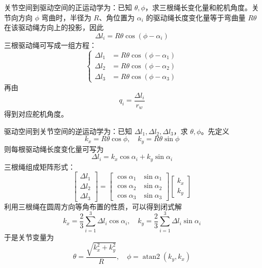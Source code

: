 \documentclass[UTF8,zihao=-4,oneside]{ctexrep}
\begin{document}
关节空间到驱动空间的正运动学为：已知 \(\theta,\phi\)，求三根绳长变化量和舵机角度。关节向方向 \(\phi\) 弯曲时，半径为 \(R\)、角位置为 \(\alpha_i\) 的驱动绳长度变化量等于弯曲量 \(R\theta\) 在该驱动绳方向上的投影，因此
\begin{equation}
  \Delta l_i = R\theta\cos(\phi-\alpha_i)
\end{equation}
三根驱动绳可写成一组方程：
\begin{equation}
  \left\{
  \begin{aligned}
    \Delta l_1 &= R\theta\cos(\phi-\alpha_1)\\
    \Delta l_2 &= R\theta\cos(\phi-\alpha_2)\\
    \Delta l_3 &= R\theta\cos(\phi-\alpha_3)
  \end{aligned}
  \right.
\end{equation}
再由
\begin{equation}
  q_i=\frac{\Delta l_i}{r_w}
\end{equation}
得到对应舵机角度。

驱动空间到关节空间的逆运动学为：已知 \(\Delta l_1,\Delta l_2,\Delta l_3\)，求 \(\theta,\phi\)。先定义
\begin{equation}
  k_x=R\theta\cos\phi,\quad k_y=R\theta\sin\phi
\end{equation}
则每根驱动绳长度变化量可写为
\begin{equation}
  \Delta l_i=k_x\cos\alpha_i+k_y\sin\alpha_i
\end{equation}
三根绳组成矩阵形式：
\begin{equation}
  \begin{bmatrix}
    \Delta l_1\\
    \Delta l_2\\
    \Delta l_3
  \end{bmatrix}
  =
  \begin{bmatrix}
    \cos\alpha_1 & \sin\alpha_1\\
    \cos\alpha_2 & \sin\alpha_2\\
    \cos\alpha_3 & \sin\alpha_3
  \end{bmatrix}
  \begin{bmatrix}
    k_x\\
    k_y
  \end{bmatrix}
\end{equation}
利用三根绳在圆周方向等角布置的性质，可以得到闭式解
\begin{equation}
  k_x = \frac{2}{3}\sum_{i=1}^{3}\Delta l_i\cos\alpha_i,\quad
  k_y = \frac{2}{3}\sum_{i=1}^{3}\Delta l_i\sin\alpha_i
\end{equation}
于是关节变量为
\begin{equation}
  \theta=\frac{\sqrt{k_x^2+k_y^2}}{R},\quad
  \phi=\operatorname{atan2}(k_y,k_x)
\end{equation}
\end{document}
